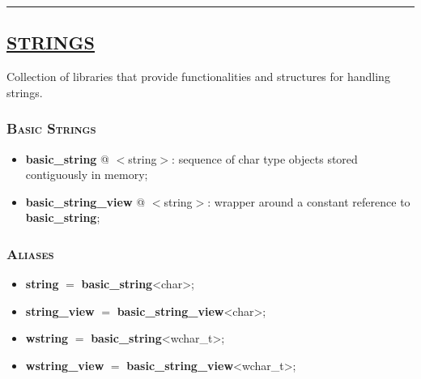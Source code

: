 \documentclass[10pt]{article}
\begin{document}
\begin{multicols*}{5}
\par\noindent\rule{155pt}{0.4pt}

{\color{Blue}
\subsection*{\href{https://en.cppreference.com/w/cpp/string}{\underline{STRINGS}}}	
\noindent
Collection of libraries that provide functionalities and structures for handling strings.

\subsubsection*{\textsc{Basic Strings}} 
\begin{itemize}[leftmargin=*,topsep=0.25pt]
  \setlength\itemsep{-1.8pt}
	\item  {\textbf{basic\_string}} @ $<$string$>$: sequence of char type objects stored contiguously in memory;
	\item  {\textbf{basic\_string\_view}} @ $<$string$>$: wrapper around a constant reference to \textbf{basic\_string};
\end{itemize}


\subsubsection*{\textsc{Aliases}} 
\begin{itemize}[leftmargin=*,topsep=0.25pt]
  \setlength\itemsep{-1.8pt}
	\item \textbf{string} $=$ \textbf{basic\_string}<char>;
	\item \textbf{string\_view} $=$ \textbf{basic\_string\_view}<char>;
	\item \textbf{wstring} $=$ \textbf{basic\_string}<wchar\_t>;
	\item \textbf{wstring\_view} $=$ \textbf{basic\_string\_view}<wchar\_t>;
\end{itemize}

}
\end{multicols*}
\end{document}
